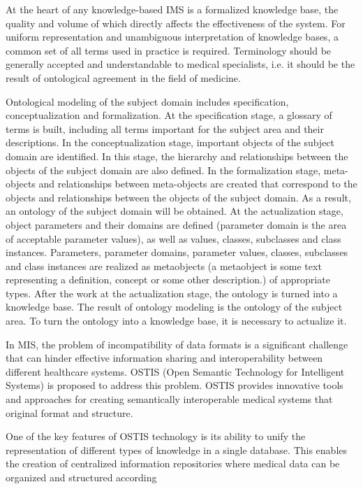 \documentclass{article}
\begin{document}
\begin{multicols}{2}
At the heart of any knowledge-based IMS is a formalized knowledge base, the quality and volume of
which directly affects the effectiveness of the system. For
uniform representation and unambiguous interpretation
of knowledge bases, a common set of all terms used
in practice is required. Terminology should be generally
accepted and understandable to medical specialists, i.e.
it should be the result of ontological agreement in the
field of medicine.

Ontological modeling of the subject domain includes
specification, conceptualization and formalization. At the
specification stage, a glossary of terms is built, including
all terms important for the subject area and their descriptions. In the conceptualization stage, important objects of
the subject domain are identified. In this stage, the hierarchy and relationships between the objects of the subject
domain are also defined. In the formalization stage,
meta-objects and relationships between meta-objects are
created that correspond to the objects and relationships
between the objects of the subject domain. As a result,
an ontology of the subject domain will be obtained.
At the actualization stage, object parameters and their
domains are defined (parameter domain is the area of
acceptable parameter values), as well as values, classes,
subclasses and class instances. Parameters, parameter
domains, parameter values, classes, subclasses and class
instances are realized as metaobjects (a metaobject is
some text representing a definition, concept or some
other description.) of appropriate types. After the work
at the actualization stage, the ontology is turned into a
knowledge base. The result of ontology modeling is the
ontology of the subject area. To turn the ontology into a
knowledge base, it is necessary to actualize it.
\par In MIS, the problem of incompatibility of data formats
is a significant challenge that can hinder effective information sharing and interoperability between different
healthcare systems. OSTIS (Open Semantic Technology
for Intelligent Systems) is proposed to address this problem. OSTIS provides innovative tools and approaches for
creating semantically interoperable medical systems that
original format and structure.
\par One of the key features of OSTIS technology is its
ability to unify the representation of different types
of knowledge in a single database. This enables the
creation of centralized information repositories where
medical data can be organized and structured according

\end{multicols}
\end{document}
